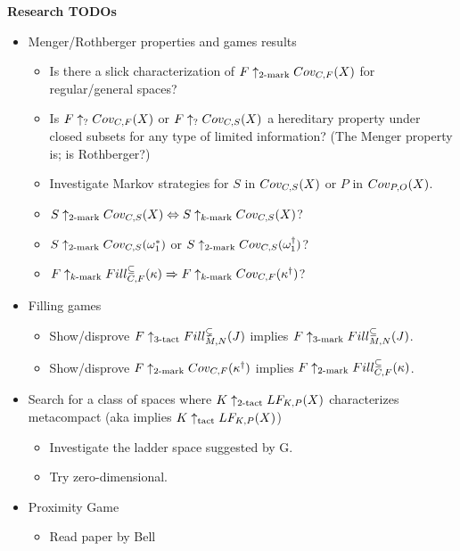 


\centerline{\bf Research TODOs}

  \begin{itemize}
    \item Menger/Rothberger properties and games results
      \begin{itemize}
        \item Is there a slick characterization of $F\uparrow_{2\text{-mark}}Cov_{C,F}(X)$ for regular/general spaces?
        \item Is $F\uparrow_{?}Cov_{C,F}(X)$ or $F\uparrow_{?}Cov_{C,S}(X)$ a hereditary property under closed subsets for any type of limited information? (The Menger property is; is Rothberger?)
        \item Investigate Markov strategies for $S$ in $Cov_{C,S}(X)$ or $P$ in $Cov_{P,O}(X)$.
        \item $S\uparrow_{2\text{-mark}}Cov_{C,S}(X)\Leftrightarrow S\uparrow_{k\text{-mark}}Cov_{C,S}(X)$?
        \item $S\uparrow_{2\text{-mark}}Cov_{C,S}(\omega_1^*)$ or $S\uparrow_{2\text{-mark}}Cov_{C,S}(\omega_1^\dagger)$?
        \item $F\uparrow_{k\text{-mark}}Fill^{\subseteq}_{C,F}(\kappa) \Rightarrow F\uparrow_{k\text{-mark}}Cov_{C,F}(\kappa^\dagger)$?
      \end{itemize}
    \item Filling games
      \begin{itemize}
        \item Show/disprove $F\uparrow_{3\text{-tact}}Fill^{\subsetneq}_{M,N}(J)$ implies $F\uparrow_{3\text{-mark}}Fill^{\subseteq}_{M,N}(J)$.
        \item Show/disprove $F\uparrow_{2\text{-mark}}Cov_{C,F}(\kappa^\dagger)$ implies $F\uparrow_{2\text{-mark}}Fill^{\subseteq}_{C,F}(\kappa)$.
      \end{itemize}
    \item Search for a class of spaces where $K\uparrow_{2\text{-tact}}LF_{K,P}(X)$ characterizes metacompact (aka implies $K\uparrow_{\text{tact}}LF_{K,P}(X)$)
      \begin{itemize}
        \item Investigate the ladder space suggested by G.
        \item Try zero-dimensional.
      \end{itemize}
    \item Proximity Game
      \begin{itemize}
        \item Read paper by Bell
      \end{itemize}
  \end{itemize}
